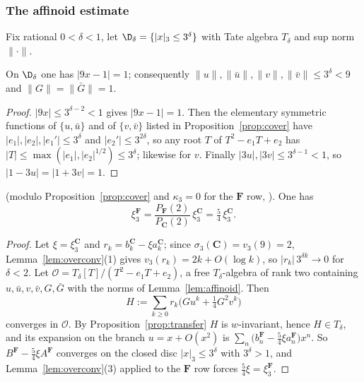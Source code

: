 \subsubsection*{The affinoid estimate}

Fix rational $0<\delta<1$, let $\D_\delta=\{|x|_3\le3^\delta\}$ with Tate algebra
$T_\delta$ and sup norm $\|\cdot\|$.

\begin{lemma}\label{lem:affinoid}
\Proved{} On $\D_\delta$ one has $|9x-1|=1$; consequently
$\|u\|,\|\bar u\|,\|v\|,\|\bar v\|\le3^\delta<9$ and $\|G\|=\|\bar G\|=1$.
\end{lemma}
\begin{proof}
$|9x|\le3^{\delta-2}<1$ gives $|9x-1|=1$.  Then the elementary symmetric functions
of $\{u,\bar u\}$ and of $\{v,\bar v\}$ listed in Proposition~\ref{prop:cover} have
$|e_1|,|e_2|,|e_1'|\le3^\delta$ and $|e_2'|\le3^{2\delta}$, so any root $T$ of
$T^2-e_1T+e_2$ has $|T|\le\max(|e_1|,|e_2|^{1/2})\le3^\delta$; likewise for $v$.
Finally $|3u|,|3v|\le3^{\delta-1}<1$, so $|1-3u|=|1+3v|=1$.
\end{proof}

\begin{theorem}[prime-to-$p$ Hecke functoriality, case $(\mathbf C,\mathbf F)$, $p=3$]
\label{thm:CF3}
\Proved{} (modulo Proposition~\ref{prop:cover} and $\kappa_3=0$ for the $\mathbf F$
row, ).  One has
\[
\boxed{\ \xi_3^{\mathbf F}=\frac{P_{\mathbf F}(2)}{P_{\mathbf C}(2)}\,\xi_3^{\mathbf C}
=\tfrac54\,\xi_3^{\mathbf C}.\ }
\]
\end{theorem}
\begin{proof}
Let $\xi=\xi_3^{\mathbf C}$ and $r_k=b_k^{\mathbf C}-\xi a_k^{\mathbf C}$; since
$\sigma_3(\mathbf C)=v_3(9)=2$, Lemma~\ref{lem:overconv}(1) gives
$v_3(r_k)=2k+O(\log k)$, so $|r_k|\,3^{\delta k}\to0$ for $\delta<2$.  Let
$\mathcal O=T_\delta[T]/(T^2-e_1T+e_2)$, a free $T_\delta$-algebra of rank two
containing $u,\bar u,v,\bar v,G,\bar G$ with the norms of
Lemma~\ref{lem:affinoid}.  Then
\[
H:=\sum_{k\ge0}r_k\bigl(Gu^k+\tfrac14G^2v^k\bigr)
\]
converges in $\mathcal O$.  By Proposition~\ref{prop:transfer} $H$ is $w$-invariant,
hence $H\in T_\delta$, and its expansion on the branch $u=x+O(x^2)$ is
$\sum_n\bigl(b_n^{\mathbf F}-\tfrac54\xi a_n^{\mathbf F}\bigr)x^n$.  So
$B^{\mathbf F}-\tfrac54\xi A^{\mathbf F}$ converges on the closed disc
$|x|_3\le3^\delta$ with $3^\delta>1$, and Lemma~\ref{lem:overconv}(3) applied to the
$\mathbf F$ row forces $\tfrac54\xi=\xi_3^{\mathbf F}$.
\end{proof}

